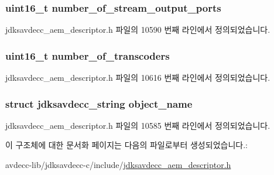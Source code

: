 \subsubsection[{\texorpdfstring{number\+\_\+of\+\_\+stream\+\_\+output\+\_\+ports}{number_of_stream_output_ports}}]{\setlength{\rightskip}{0pt plus 5cm}uint16\+\_\+t number\+\_\+of\+\_\+stream\+\_\+output\+\_\+ports}\hypertarget{structjdksavdecc__descriptor__sensor__unit_a6b331604e3f2b2db126dbf0a7c81b0fa}{}\label{structjdksavdecc__descriptor__sensor__unit_a6b331604e3f2b2db126dbf0a7c81b0fa}


jdksavdecc\+\_\+aem\+\_\+descriptor.\+h 파일의 10590 번째 라인에서 정의되었습니다.

\subsubsection[{\texorpdfstring{number\+\_\+of\+\_\+transcoders}{number_of_transcoders}}]{\setlength{\rightskip}{0pt plus 5cm}uint16\+\_\+t number\+\_\+of\+\_\+transcoders}\hypertarget{structjdksavdecc__descriptor__sensor__unit_ad9030c572f8891febbc6108f96772835}{}\label{structjdksavdecc__descriptor__sensor__unit_ad9030c572f8891febbc6108f96772835}


jdksavdecc\+\_\+aem\+\_\+descriptor.\+h 파일의 10616 번째 라인에서 정의되었습니다.

\subsubsection[{\texorpdfstring{object\+\_\+name}{object_name}}]{\setlength{\rightskip}{0pt plus 5cm}struct {\bf jdksavdecc\+\_\+string} object\+\_\+name}\hypertarget{structjdksavdecc__descriptor__sensor__unit_a7d1f5945a13863b1762fc6db74fa8f80}{}\label{structjdksavdecc__descriptor__sensor__unit_a7d1f5945a13863b1762fc6db74fa8f80}


jdksavdecc\+\_\+aem\+\_\+descriptor.\+h 파일의 10585 번째 라인에서 정의되었습니다.



이 구조체에 대한 문서화 페이지는 다음의 파일로부터 생성되었습니다.\+:\begin{DoxyCompactItemize}
\item 
avdecc-\/lib/jdksavdecc-\/c/include/\hyperlink{jdksavdecc__aem__descriptor_8h}{jdksavdecc\+\_\+aem\+\_\+descriptor.\+h}\end{DoxyCompactItemize}
